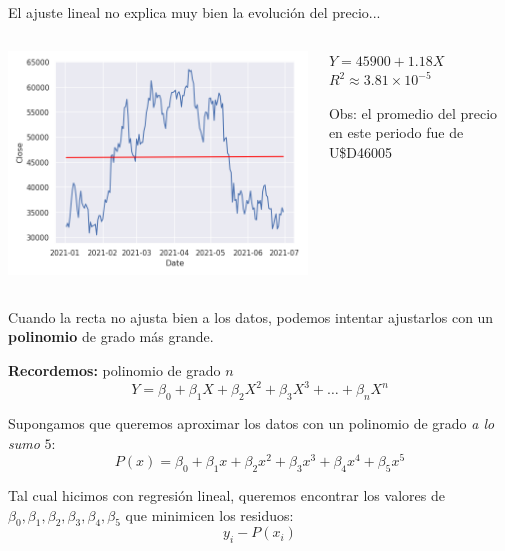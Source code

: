\documentclass[aspectratio=169, usenames,dvipsnames]{beamer}
\begin{document}
\begin{frame}
    \centering
    El ajuste lineal no explica muy bien la evolución del precio...
    \begin{columns}
        \begin{column}{0.7\textwidth}
        \includegraphics[width=\textwidth]{img/bitcoin_lr.png}
        \end{column}
        \begin{column}{0.3\textwidth}
        $Y = 45900 + 1.18 X$
        $R^2 \approx 3.81 \times 10^{-5}$

        \vspace{2em}
        Obs: el promedio del precio en este periodo fue de U\$D46005
        \end{column}
    \end{columns}
\end{frame}

\begin{frame}
    Cuando la recta no ajusta bien a los datos, podemos intentar ajustarlos con un \textbf{polinomio} de grado más grande.

    \vspace{2em}
    \textbf{Recordemos:} polinomio de grado $n$
    \[ Y = \beta_0 + \beta_1 X + \beta_2 X^2 + \beta_3 X^3 + \dots + \beta_n X^n\]
\end{frame}

\begin{frame}
    Supongamos que queremos aproximar los datos con un polinomio de grado \textit{a lo sumo} $5$:
    \[P(x) = \beta_0 + \beta_1 x + \beta_2 x^2 + \beta_3 x^3 + \beta_4 x^4 + \beta_5 x^5 \]

    \pause
    Tal cual hicimos con regresión lineal, queremos encontrar los valores de $\beta_0, \beta_1, \beta_2, \beta_3, \beta_4, \beta_5$ que minimicen los residuos:
    \[y_i - P(x_i)\]
\end{frame}
\end{document}

